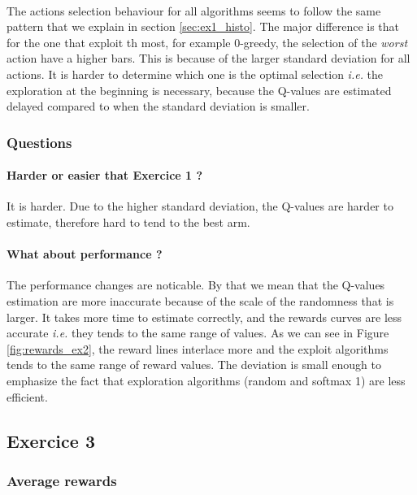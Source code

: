 \documentclass[letterpaper]{article}
\begin{document}
\paragraph{}

The actions selection behaviour for all algorithms seems to follow
the same pattern that we explain in section \ref{sec:ex1_histo}.
The major difference is that for the one that exploit th most, for example
$0$-greedy, the selection of the \textit{worst} action have a higher
bars. This is because of the larger standard deviation for all actions.
It is harder to determine which one is the optimal selection \textit{i.e.}
the exploration at the beginning is necessary, because the Q-values
are estimated delayed compared to when the standard deviation is smaller.

\subsubsection{Questions}

\paragraph{Harder or easier that Exercice 1 ?}

It is harder. Due to the higher standard deviation, the Q-values are
harder to estimate, therefore hard to tend to the best arm.

\paragraph{What about performance ?}

The performance changes are noticable.
By that we mean that the Q-values estimation
are more inaccurate because of the scale of the randomness that is larger.
It takes more time to estimate correctly, and the rewards curves are less
accurate \textit{i.e.} they tends to the same range of values. As we can
see in Figure \ref{fig:rewards_ex2}, the reward lines interlace more
and the exploit algorithms tends to the same range of reward values. The
deviation is small enough to emphasize the fact that exploration algorithms
(random and softmax 1)
are less efficient.

\subsection{Exercice 3}

\subsubsection{Average rewards}
\end{document}
